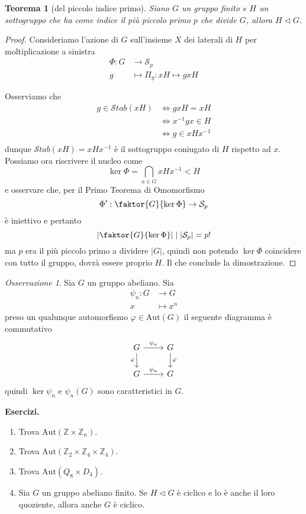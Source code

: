 \documentclass[a4paper]{article}
\newtheorem{theorem}{Teorema}[section]
\theoremstyle{remark}
\newtheorem*{remark}{Osservazione}
\theoremstyle{definition}
\newcommand{\Aut}[1]{\mathrm{Aut}\left( #1 \right)}
\newcommand{\Stab}[1]{\mathcal{S}tab\left( #1 \right)}
\newcommand{\fun}[5]{
	\begin{align*}
	#1 \colon #2 &\to #3 \\
	#4 &\mapsto #5
	\end{align*}
}
\begin{document}
\begin{multicols}{2}
	
\begin{theorem}[del piccolo indice primo]\label{ppp}
	Siano $ G $ un gruppo finito e $ H $ un sottogruppo che ha come indice il più piccolo primo $ p $ che divide $ G $, allora $ H \lhd G $.
\end{theorem}
\begin{proof}
	Consideriamo l'azione di $ G $ sull'insieme $ X $ dei laterali di $ H $ per moltiplicazione a sinistra \fun{\Phi}{G}{\mathcal{S}_p}{g}{\Pi_g : xH \mapsto gxH}
	Osserviamo che 
	\begin{align*}
		g \in \Stab{xH} &\Leftrightarrow gxH = xH \\
		&\Leftrightarrow x^{-1}gx \in H \\
		&\Leftrightarrow g \in xHx^{-1} \\
	\end{align*}
	dunque $ \Stab{xH} = xHx^{-1} $ è il sottogruppo coniugato di $ H $ rispetto ad $ x $. Possiamo ora riscrivere il nucleo come
	\[ \ker\Phi = \bigcap_{x \in G} xHx^{-1} < H \]
	e osservare che, per il Primo Teorema di Omomorfismo
	\[ \Phi ' : \faktor{G}{\ker\Phi} \rightarrow \mathcal{S}_p \]
	è iniettivo e pertanto
	\[ \left| \faktor{G}{\ker\Phi} \right| \mid |\mathcal{S}_p| = p! \]
	ma $ p $ era il più piccolo primo a dividere $ |G| $, quindi non potendo $ \ker\Phi $ coincidere con tutto il gruppo, dovrà essere proprio $ H $. Il che conclude la dimostrazione.
\end{proof}

\begin{remark}
	Sia $ G $ un gruppo abeliano. Sia \fun{\psi_n}{G}{G}{x}{x^n} preso un qualunque automorfismo $ \varphi \in \Aut{G} $ il seguente diagramma è commutativo
	\[ \begin{tikzcd}
	G \arrow{r}{\psi _n} \arrow[swap]{d}{\varphi} & G \arrow{d}{\varphi} \\
	G \arrow{r}{\psi _n} & G
	\end{tikzcd}
	\]
	quindi $ \ker\psi _n $ e $ \psi _n(G) $ sono caratteristici in $ G $. \\
	
\end{remark}
	
	\textbf{Esercizi.}
	\begin{enumerate}
		\item Trova $ \Aut{\mathbb{Z}\times\mathbb{Z}_n} $.
		\item Trova $ \Aut{\mathbb{Z}_2\times\mathbb{Z}_4\times\mathbb{Z}_4} $.
		\item Trova $ \Aut{Q_8 \times D_4} $.
		\item Sia $ G $ un gruppo abeliano finito. Se $ H \lhd G $ è ciclico e lo è anche il loro quoziente, allora anche $ G $ è ciclico.
	\end{enumerate}
\end{multicols}
\end{document}
